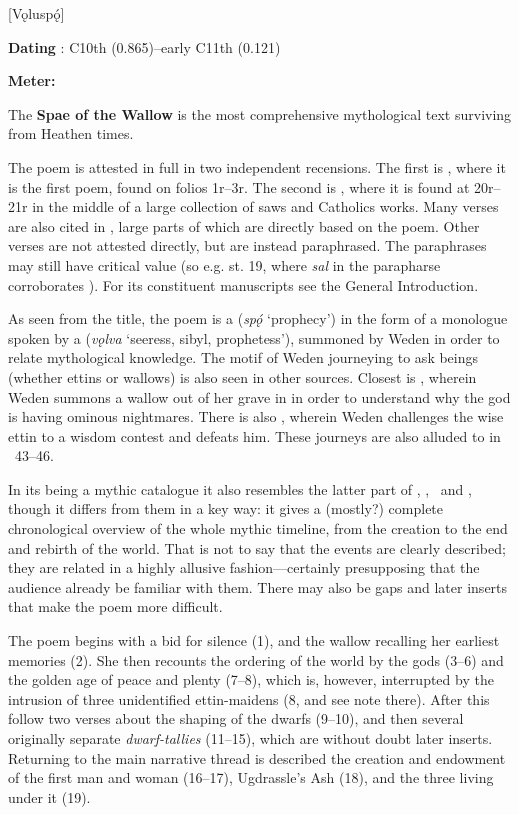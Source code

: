 [Vǫluspǫ́]

\begin{flushright}%
\textbf{Dating} \parencite{Sapp2022}: C10th (0.865)–early C11th (0.121)

\textbf{Meter:} \Fornyrdislag%
\end{flushright}

The \textbf{Spae of the Wallow} is the most comprehensive mythological text surviving from Heathen times.

The poem is attested in full in two independent recensions. The first is \Regius, where it is the first poem, found on folios 1r–3r. The second is \Hauksbok, where it is found at 20r–21r in the middle of a large collection of saws and Catholics works. Many verses are also cited in \Gylfaginning, large parts of which are directly based on the poem. Other verses are not attested directly, but are instead paraphrased. The paraphrases may still have critical value (so e.g. st. 19, where \emph{sal} in the parapharse corroborates \Hauksbok). For its constituent manuscripts see the General Introduction. %

As seen from the title, the poem is a  (\emph{spǫ́} ‘prophecy’) in the form of a monologue spoken by a  (\emph{vǫlva} ‘seeress, sibyl, prophetess’), summoned by Weden in order to relate mythological knowledge. The motif of Weden journeying to ask beings (whether ettins or wallows) is also seen in other sources. Closest is \Baldrsdraumar, wherein Weden summons a wallow out of her grave in  in order to understand why the god  is having ominous nightmares. There is also \Vafthrudnismal, wherein Weden challenges the wise ettin  to a wisdom contest and defeats him. These journeys are also alluded to in \Harbardsljod\ 43–46.

In its being a mythic catalogue it also resembles the latter part of \Havamal, \Grimnismal, \Sigrdrifumal\ and \Allvismal, though it differs from them in a key way: it gives a (mostly?) complete chronological overview of the whole mythic timeline, from the creation to the end and rebirth of the world. That is not to say that the events are clearly described; they are related in a highly allusive fashion—certainly presupposing that the audience already be familiar with them. There may also be gaps and later inserts that make the poem more difficult.

\sectionline

The poem begins with a bid for silence (1), and the wallow recalling her earliest memories (2). She then recounts the ordering of the world by the gods (3–6) and the golden age of peace and plenty (7–8), which is, however, interrupted by the intrusion of three unidentified ettin-maidens (8, and see note there). After this follow two verses about the shaping of the dwarfs (9–10), and then several originally separate \emph{dwarf-tallies} (11–15), which are without doubt later inserts. Returning to the main narrative thread is described the creation and endowment of the first man and woman (16–17), Ugdrassle’s Ash (18), and the three  living under it (19).

